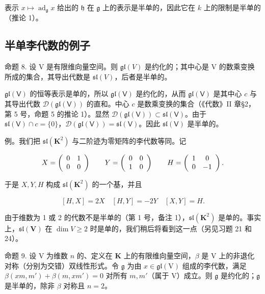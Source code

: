 表示 \(x \mapsto \operatorname{ad}_{\mathfrak{g}} x\) 给出的 \(\mathfrak{h}\) 在 \(\mathfrak{g}\) 上的表示是半单的，因此它在 \(k\) 上的限制是半单的（推论 1）。

\subsection{半单李代数的例子}

命题 8. 设 V 是有限维向量空间。则 \(\mathfrak{gl}(V)\) 是约化的；其中心是 V 的数乘变换所成的集合，其导出代数是 \(\mathfrak{sl}(V)\)，后者是半单的。

\(\mathfrak{gl}(\mathsf{V})\) 的恒等表示是单的，所以 \(\mathfrak{gl}(\mathsf{V})\) 是约化的，从而 \(\mathfrak{gl}(\mathsf{V})\) 是其中心 \(c\) 与其导出代数 \(\mathcal{D}(\mathfrak{gl}(\mathsf{V}))\) 的直和。中心 \(c\) 是数乘变换的集合（《代数》II 章§2，第 5 号，命题 5 的推论 1）。显然 \(\mathcal{D}(\mathfrak{gl}(\mathsf{V})) \subset \mathfrak{sl}(\mathsf{V})\)。由于 \(\mathfrak{sl}(\mathsf{V}) \cap c = \{0\}\)，\(\mathcal{D}(\mathfrak{gl}(\mathsf{V})) = \mathfrak{sl}(\mathsf{V})\)。因此 \(\mathfrak{sl}(\mathsf{V})\) 是半单的。

例。我们把 \(\mathfrak{sl}(\mathbf{K}^{2})\) 与二阶迹为零矩阵的李代数等同。记

\[
X = \left( \begin{array}{c c} 0 & 1 \\ 0 & 0 \end{array} \right) \qquad Y = \left( \begin{array}{c c} 0 & 0 \\ 1 & 0 \end{array} \right) \qquad H = \left( \begin{array}{c c} 1 & 0 \\ 0 & - 1 \end{array} \right).
\]

于是 \(X, Y, H\) 构成 \(\mathfrak{sl}(\mathbf{K}^2)\) 的一个基，并且

\[
[ H, X ] = 2 X \quad [ H, Y ] = - 2 Y \quad [ X, Y ] = H.
\]

由于维数为 1 或 2 的代数不是半单的（第 1 号，备注 1），\(\mathfrak{sl}(\mathbf{K}^2)\) 是单的。事实上，\(\mathfrak{sl}(\mathbf{V})\) 在 \(\dim V \geqslant 2\) 时是单的，我们稍后将看到这一点（另见习题 21 和 24）。

命题 9. 设 \(\mathrm{V}\) 为维数 \(n\) 的、定义在 \(\mathbf{K}\) 上的有限维向量空间，\(\beta\) 是 \(\mathrm{V}\) 上的非退化对称（分别为交错）双线性形式。令 \(\mathfrak{g}\) 为由 \(x \in \mathfrak{gl}(\mathrm{V})\) 组成的李代数，满足 \(\beta (xm, m') + \beta (m, xm') = 0\) 对所有 \(m, m'\)（属于 \(\mathrm{V}\)）成立。则 \(\mathfrak{g}\) 是约化的；\(\mathfrak{g}\) 是半单的，除非 \(\beta\) 对称且 \(n = 2\)。

